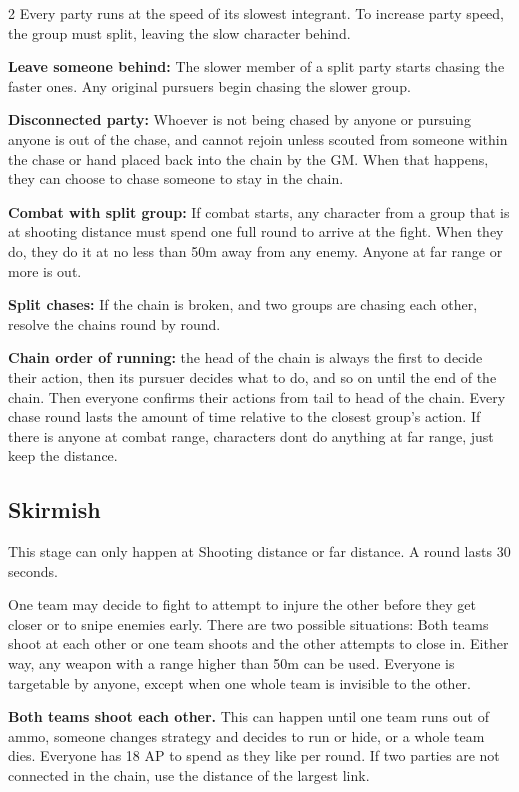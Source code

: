 \begin{multicols}{2}
Every party runs at the speed of its slowest integrant. To increase party speed, the group must split, leaving the slow character behind.

\textbf{Leave someone behind:} The slower member of a split party starts chasing the faster ones. Any original pursuers begin chasing the slower group.

\textbf{Disconnected party:} Whoever is not being chased by anyone or pursuing anyone is out of the chase, and cannot rejoin unless scouted from someone within the chase or hand placed back into the chain by the GM. When that happens, they can choose to chase someone to stay in the chain.

\textbf{Combat with split group:} If combat starts, any character from a group that is at shooting distance must spend one full round to arrive at the fight. When they do, they do it at no less than 50m away from any enemy. Anyone at far range or more is out.

\textbf{Split chases:} If the chain is broken, and two groups are chasing each other, resolve the chains round by round.

\textbf{Chain order of running:} the head of the chain is always the first to decide their action, then its pursuer decides what to do, and so on until the end of the chain. Then everyone confirms their actions from tail to head of the chain. Every chase round lasts the amount of time relative to the closest group's action. If there is anyone at combat range, characters dont do anything at far range, just keep the distance.

\subsection{Skirmish}

This stage can only happen at Shooting distance or far distance. A round lasts 30 seconds.

One team may decide to fight to attempt to injure the other before they get closer or to snipe enemies early. There are two possible situations: Both teams shoot at each other or one team shoots and the other attempts to close in. Either way, any weapon with a range higher than 50m can be used. Everyone is targetable by anyone, except when one whole team is invisible to the other.

\textbf{Both teams shoot each other.} This can happen until one team runs out of ammo, someone changes strategy and decides to run or hide, or a whole team dies. Everyone has 18 AP to spend as they like per round. If two parties are not connected in the chain, use the distance of the largest link. 


\end{multicols}
